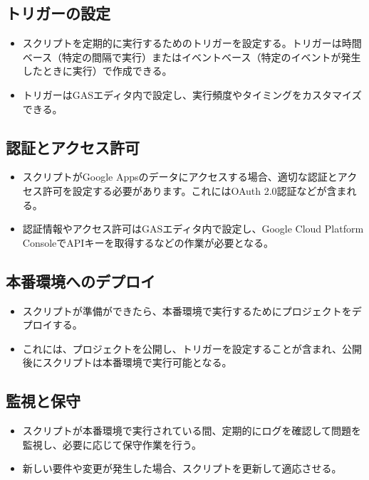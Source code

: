 \documentclass{jsarticle}
\begin{document}
\subsection{トリガーの設定}
\begin{itemize}
    \item スクリプトを定期的に実行するためのトリガーを設定する。トリガーは時間ベース（特定の間隔で実行）またはイベントベース（特定のイベントが発生したときに実行）で作成できる。
    \item トリガーはGASエディタ内で設定し、実行頻度やタイミングをカスタマイズできる。
\end{itemize}

\subsection{認証とアクセス許可}
\begin{itemize}
    \item スクリプトがGoogle Appsのデータにアクセスする場合、適切な認証とアクセス許可を設定する必要があります。これにはOAuth 2.0認証などが含まれる。
    \item 認証情報やアクセス許可はGASエディタ内で設定し、Google Cloud Platform ConsoleでAPIキーを取得するなどの作業が必要となる。
\end{itemize}

\subsection{本番環境へのデプロイ}
\begin{itemize}
    \item スクリプトが準備ができたら、本番環境で実行するためにプロジェクトをデプロイする。
    \item これには、プロジェクトを公開し、トリガーを設定することが含まれ、公開後にスクリプトは本番環境で実行可能となる。
\end{itemize}

\subsection{監視と保守}
\begin{itemize}
    \item スクリプトが本番環境で実行されている間、定期的にログを確認して問題を監視し、必要に応じて保守作業を行う。
    \item 新しい要件や変更が発生した場合、スクリプトを更新して適応させる。
\end{itemize}
\end{document}
